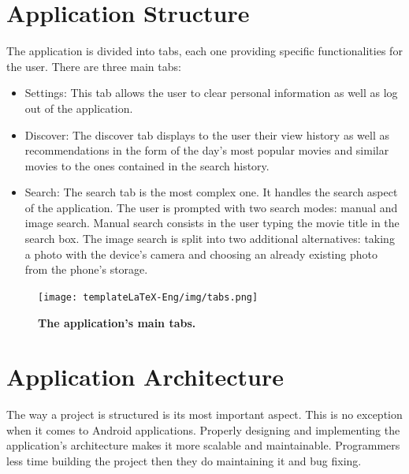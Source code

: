 \documentclass[12pt,a4paper,twoside]{report}
\begin{document}
\section{Application Structure}
The application is divided into tabs, each one providing specific functionalities for the user. There are three main tabs:
\begin{itemize}
    \item Settings: This tab allows the user to clear personal information as well as log out of the application.
    \item Discover: The discover tab displays to the user their view history as well as recommendations in the form of the day's most popular movies and similar movies to the ones contained in the search history.
    \item Search: The search tab is the most complex one. It handles the search aspect of the application. The user is prompted with two search modes: manual and image search. Manual search consists in the user typing the movie title in the search box. The image search is split into two additional alternatives: taking a photo with the device's camera and choosing an already existing photo from the phone's storage.
\end{itemize}
 \begin{figure}[H]
    \begin{center}
        \texttt{[image: templateLaTeX-Eng/img/tabs.png]}
        \caption{\bf The application's main tabs.}
    \end{center}
\end{figure}


\section{Application Architecture}
The way a project is structured is its most important aspect. This is no exception when it comes to Android applications. Properly designing and implementing the application's architecture makes it more scalable and maintainable. Programmers less time building the project then they do maintaining it and bug fixing.
\end{document}
